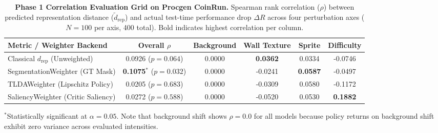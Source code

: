 \begin{table}[t]
\centering
\small
\caption{\textbf{Phase 1 Correlation Evaluation Grid on Procgen CoinRun.} Spearman rank correlation ($\rho$) between predicted representation distance ($\tilde{d}_\mathrm{rep}$) and actual test-time performance drop $\Delta R$ across four perturbation axes ($N=100$ per axis, 400 total). Bold indicates highest correlation per column.}
\label{tab:phase1_semantic}
\begin{tabular}{lccccc}
\toprule
\textbf{Metric / Weighter Backend} & \textbf{Overall $\rho$} & \textbf{Background} & \textbf{Wall Texture} & \textbf{Sprite} & \textbf{Difficulty} \\
\midrule
Classical $d_\mathrm{rep}$ (Unweighted) & 0.0926 ($p=0.064$) & 0.0000 & \textbf{0.0362} & 0.0334 & -0.0746 \\
SegmentationWeighter (GT Mask) & \textbf{0.1075}$^*$ ($p=0.032$) & 0.0000 & -0.0241 & \textbf{0.0587} & -0.0497 \\
TLDAWeighter (Lipschitz Policy) & 0.0205 ($p=0.683$) & 0.0000 & -0.0309 & 0.0580 & -0.1172 \\
SaliencyWeighter (Critic Saliency) & 0.0272 ($p=0.588$) & 0.0000 & -0.0520 & 0.0530 & \textbf{0.1882} \\
\bottomrule
\end{tabular}
\begin{flushleft}
\footnotesize{$^*$Statistically significant at $\alpha = 0.05$. Note that background shift shows $\rho = 0.0$ for all models because policy returns on background shift exhibit zero variance across evaluated intensities.}
\end{flushleft}
\end{table}
